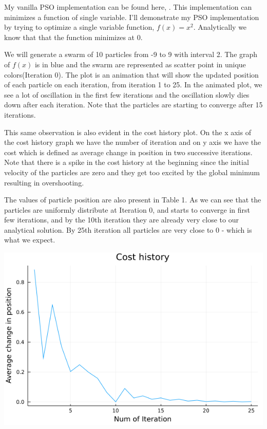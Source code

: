 \documentclass{article}
\begin{document}
My vanilla PSO implementation can be found here, \cite{irfan_2021J}. This implementation can minimizes a function of single variable. I'll demonstrate my PSO implementation by trying to optimize a single variable function, $f(x) = x^2$. Analytically we know that that the function minimizes at 0.

We will generate a swarm of 10 particles from -9 to 9 with interval 2. The graph of $f(x)$ is in blue and the swarm are represented as scatter point in unique colors(Iteration 0). The plot is an animation that will show the updated position of each particle on each iteration, from iteration 1 to 25. In the animated plot, we see a lot of oscillation in the first few iterations and the oscillation slowly dies down after each iteration. Note that the particles are starting to converge after 15 iterations.  

This same observation is also evident in the cost history plot. On the x axis of the cost history graph we have the number of iteration and on y axis we have the cost which is defined as average change in position in two successive iterations. Note that there is a spike in the cost history at the beginning since the initial velocity of the particles are zero and they get too excited by the global minimum resulting in overshooting.

The values of particle position are also present in Table 1. As we can see that the particles are uniformly distribute at Iteration 0, and starts to converge in first few iterations, and by the 10th iteration they are already very close to our analytical solution. By 25th iteration all particles are very close to 0 - which is what we expect.

\begin{center}
\includegraphics[width=\linewidth]{./plots/CostHistory.png}
\end{center}
\end{document}
